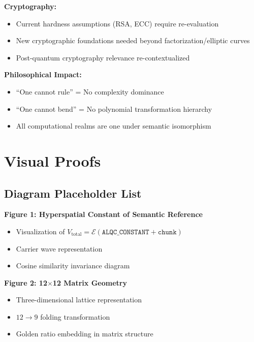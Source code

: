 \textbf{Cryptography:}
\begin{itemize}
    \item Current hardness assumptions (RSA, ECC) require re-evaluation
    \item New cryptographic foundations needed beyond factorization/elliptic curves
    \item Post-quantum cryptography relevance re-contextualized
\end{itemize}

\textbf{Philosophical Impact:}
\begin{itemize}
    \item ``One cannot rule'' = No complexity dominance
    \item ``One cannot bend'' = No polynomial transformation hierarchy
    \item All computational realms are one under semantic isomorphism
\end{itemize}

\section{Visual Proofs}

\subsection{Diagram Placeholder List}

\textbf{Figure 1: Hyperspatial Constant of Semantic Reference}
\begin{itemize}
    \item Visualization of $V_{\text{total}} = \mathcal{E}(\texttt{ALQC\_CONSTANT} + \texttt{chunk})$
    \item Carrier wave representation
    \item Cosine similarity invariance diagram
\end{itemize}

\textbf{Figure 2: 12$\times$12 Matrix Geometry}
\begin{itemize}
    \item Three-dimensional lattice representation
    \item $12 \to 9$ folding transformation
    \item Golden ratio embedding in matrix structure
\end{itemize}

